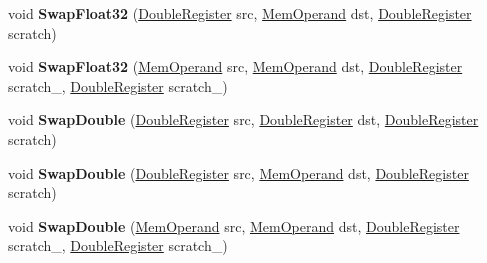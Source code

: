 \begin{DoxyCompactItemize}
\item 
\mbox{\label{classv8_1_1internal_1_1TurboAssembler_a41506f06d21b8d3c2a359fc73e5bf1b6}} 
void {\bfseries Swap\+Float32} (\mbox{\hyperlink{classv8_1_1internal_1_1DoubleRegister}{Double\+Register}} src, \mbox{\hyperlink{classv8_1_1internal_1_1MemOperand}{Mem\+Operand}} dst, \mbox{\hyperlink{classv8_1_1internal_1_1DoubleRegister}{Double\+Register}} scratch)
\item 
\mbox{\label{classv8_1_1internal_1_1TurboAssembler_aa1db907554730812ae06a34ff6423555}} 
void {\bfseries Swap\+Float32} (\mbox{\hyperlink{classv8_1_1internal_1_1MemOperand}{Mem\+Operand}} src, \mbox{\hyperlink{classv8_1_1internal_1_1MemOperand}{Mem\+Operand}} dst, \mbox{\hyperlink{classv8_1_1internal_1_1DoubleRegister}{Double\+Register}} scratch\+\_, \mbox{\hyperlink{classv8_1_1internal_1_1DoubleRegister}{Double\+Register}} scratch\+\_)
\item 
\mbox{\label{classv8_1_1internal_1_1TurboAssembler_afd055fdfae69a6b38d24f7f96ef64b47}} 
void {\bfseries Swap\+Double} (\mbox{\hyperlink{classv8_1_1internal_1_1DoubleRegister}{Double\+Register}} src, \mbox{\hyperlink{classv8_1_1internal_1_1DoubleRegister}{Double\+Register}} dst, \mbox{\hyperlink{classv8_1_1internal_1_1DoubleRegister}{Double\+Register}} scratch)
\item 
\mbox{\label{classv8_1_1internal_1_1TurboAssembler_a99e65360c04b18e2e4d7eb7bd882bb5a}} 
void {\bfseries Swap\+Double} (\mbox{\hyperlink{classv8_1_1internal_1_1DoubleRegister}{Double\+Register}} src, \mbox{\hyperlink{classv8_1_1internal_1_1MemOperand}{Mem\+Operand}} dst, \mbox{\hyperlink{classv8_1_1internal_1_1DoubleRegister}{Double\+Register}} scratch)
\item 
\mbox{\label{classv8_1_1internal_1_1TurboAssembler_ac2aa1489f276a39f1dd2916115b8ee3f}} 
void {\bfseries Swap\+Double} (\mbox{\hyperlink{classv8_1_1internal_1_1MemOperand}{Mem\+Operand}} src, \mbox{\hyperlink{classv8_1_1internal_1_1MemOperand}{Mem\+Operand}} dst, \mbox{\hyperlink{classv8_1_1internal_1_1DoubleRegister}{Double\+Register}} scratch\+\_, \mbox{\hyperlink{classv8_1_1internal_1_1DoubleRegister}{Double\+Register}} scratch\+\_)

\end{DoxyCompactItemize}
